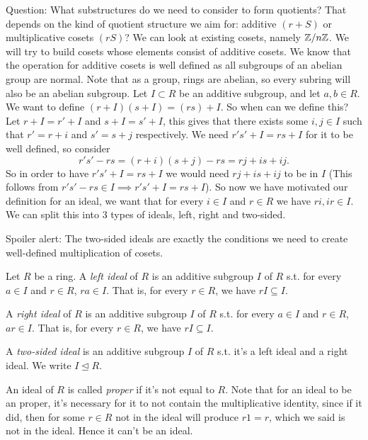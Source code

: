 Question: What substructures do we need to consider to form quotients?
That depends on the kind of quotient structure we aim for: additive $(r+S)$ or
multiplicative cosets $(rS)$? We can look at existing cosets, namely $\mathbb Z/n\mathbb Z$. We will
try to build cosets whose elements consist of additive cosets. 
We know that the operation for additive cosets is well defined as all subgroups of an abelian group are normal. Note that as a group, rings are abelian, so every subring will
also be an abelian subgroup. Let $I\subset R$ be an additive subgroup, and let $a,b\in R$.
We want to define $(r+I)(s+I)=(rs)+I$. So when can we define this?
Let $r + I = r' + I$ and $s + I = s'+ I$, this gives that there exists some $i,j \in I$ such that $r' = r + i$ and $s' = s + j$ respectively. We need $r's' + I = rs + I$ for it to be well defined, so consider
$$
r's' - rs = (r+i)(s+j) - rs = rj + is + ij.
$$
So in order to have $r's' + I = rs + I$ we would need $rj + is + ij$ to be in $I$ (This follows from $r's'-rs \in I \implies r's' + I = rs + I$). So now we have motivated our definition for an ideal, we want that for every $i \in I$ and $r \in R$ we have $ri, ir \in I$. We can split this into 3 types of ideals, left, right and two-sided.

\begin{remark}
    Spoiler alert: The two-sided ideals are exactly the conditions we need to create well-defined multiplication of cosets. 
\end{remark}



\begin{definition}
  Let $R$ be a ring. A \emph{left ideal} of $R$ is an additive subgroup $I$ of $R$ s.t.
  for every $a\in I$ and $r\in R$, $ra\in I$. That is, for every $r\in R$, we have
  $rI\subseteq I$.

  A \emph{right ideal} of $R$ is an additive subgroup $I$ of $R$ s.t. for every $a\in I$
  and $r\in R$, $ar\in I$. That is, for every $r\in R$, we have $rI\subseteq I$.

  A \emph{two-sided ideal} is an additive subgroup $I$ of $R$ s.t. it's a left ideal and a
  right ideal. We write $I\trianglelefteq R$.

  An ideal of $R$ is called \emph{proper} if it's not equal to $R$. Note that for an ideal to be an proper, it's necessary for it to not contain the
multiplicative identity, since if it did, then for some $r\in R$ not in the ideal will
produce $r1=r$, which we said is not in the ideal. Hence it can't be an ideal. 
  \label{<+label+>}
\end{definition}


